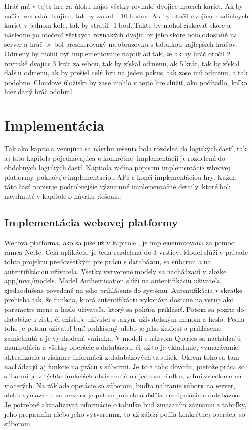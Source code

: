 Hráč má v tejto hre za úlohu nájsť všetky rovnaké dvojice hracích kariet. Ak by našiel rovnakú dvojicu, tak by získal +10 bodov.  Ak by otočil dvojicu rozdielnych kariet v jednom kole, tak by stratil -1 bod. Takto by mohol získavať skóre a následne po otočení všetkých rovnakých dvojíc by jeho skóre bolo odoslané na server a hráč by bol presmerovaný na obrazovku s tabuľkou najlepších hráčov. Odmeny by mohli byť implementované napríklad tak, že ak by hráč otočil 2 rovnaké dvojice 3 krát za sebou, tak by získal odmenu, ak 5 krát, tak by získal ďalšiu odmenu, ak by prešiel celú hru na jeden pokus, tak zase inú odmenu, a tak podobne. Cloudove úložisko by zase mohlo v tejto hre slúžiť, ako počítadlo, koľko hier daný hráč odohral. 

\chapter{Implementácia}
\label{chap:implementacia}
Tak ako kapitola venujúca sa návrhu rešenia bola rozdeleá do logických častí, tak aj táto kapitola pojednávajúca o konkrétnej implementácií je rozdelená do obdobných logických častí. Kapitola začína popisom implementácie wbvovej platformy, pokračuje implementáciou API a končí implementáciou hry.  Každá táto časť popisuje podrobnejšie významné implementačné detaily, ktoré boli navrhnuté v kapitole o návrhu riešenia. 

\section{Implementácia webovej platformy}
Webová platforma, ako sa píše už v kapitole , je implemenmtovaná za pomoci rámca Nette. Celá aplikácia, je teda rozdelená do 3 vrstiev. Model slúži v prípade tohto projektu predovšetkým pre prácu s databázou, so súbormi a na autentifikáciou užívateľa. Všetky vytvorené modely sa nachádzajú v zložke app/mvc/models. Model Authentication slúži na autentifikáciu užívateľa, zjednodušene povedané na jeho prihlásenie do systému. Autentifikácia v skratke prebieha tak, že funkcia, ktorá autentifikáciu vykonáva dostane na vstup ako parametre meno a heslo užívateľa, ktorý sa pokúša prihlásiť. Potom sa pozrie do databáze a zistí, či existuje užívateľ s takým užívateľským menom a heslo. Podľa toho je potom užívateľ buď prihlásený, alebo je jeho žiadosť o prihlásenie zamietnutá a je vyuhodená vínimka. V modeli s názvom Queries sa nachádzajú manipulácia a všetky operácie s databázou, či už to je vkladanie, vymazávanie, aktualizácia a získanie informácií z databázových tabuliek. Okrem toho sa tam nachádzajú aj funkcie na prácu s súbormi. Je to z toho dôvodu, pretože práca so súbormi je v týchto funkciách obsiahnutá na jednom riadku, veľmi zriedkavo na viacerých. Na základe operácie so súborom, buďto nahranie súboru na server, alebo vymazanie zo serveru je potom potrebná ďalšia manipulácia s databázou. Je potrebné aktualizovať informácie o tabuľke buď zmazaním záznamu z tabuľky, jeho prepísaním alebo jeho vytvorením, to už záleží podľa konkrétnej operácie so súborom. 

